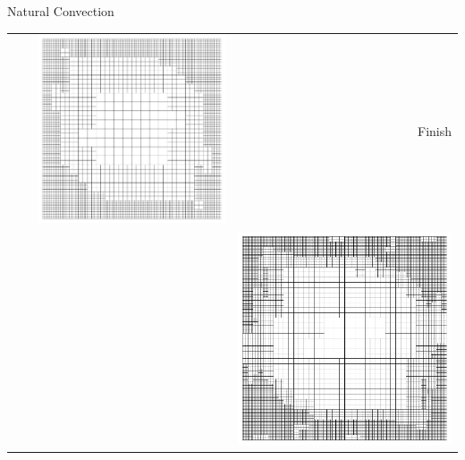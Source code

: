 \documentclass[landscape,pdftex,headrule,footrule]{foils}
\begin{document}
\begin{foil}{Natural Convection}
{{\begin{center}
\begin{tabular}{l c c r}
          & & \includegraphics[height=.22\textheight]{figures/grid2} & Finish \\
          & & & \includegraphics[height=.22\textheight]{figures/grid3} \\
        \end{tabular}
      \end{center}
    }
 
}
\end{foil}
\end{document}
